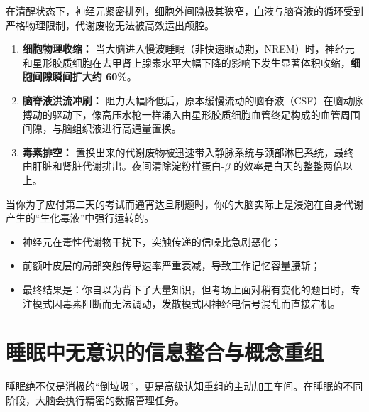 \documentclass[12pt,a4paper,openany]{ctexbook}
\begin{document}
在清醒状态下，神经元紧密排列，细胞外间隙极其狭窄，血液与脑脊液的循环受到严格物理限制，代谢废物无法被高效运出颅腔。

\begin{keypoint}[胶质淋巴系统的夜间清洗机制]
\begin{enumerate}
    \item \textbf{细胞物理收缩：} 当大脑进入慢波睡眠（非快速眼动期，NREM）时，神经元和星形胶质细胞在去甲肾上腺素水平大幅下降的影响下发生显著体积收缩，\textbf{细胞间隙瞬间扩大约 60\%}。
    \item \textbf{脑脊液洪流冲刷：} 阻力大幅降低后，原本缓慢流动的脑脊液（CSF）在脑动脉搏动的驱动下，像高压水枪一样涌入由星形胶质细胞血管终足构成的血管周围间隙，与脑组织液进行高通量置换。
    \item \textbf{毒素排空：} 置换出来的代谢废物被迅速带入静脉系统与颈部淋巴系统，最终由肝脏和肾脏代谢排出。夜间清除淀粉样蛋白-$\beta$ 的效率是白天的整整两倍以上。
\end{enumerate}
\end{keypoint}

\begin{warningbox}[熬夜突击的生化自残]
当你为了应付第二天的考试而通宵达旦刷题时，你的大脑实际上是浸泡在自身代谢产生的“生化毒液”中强行运转的。
\begin{itemize}
    \item 神经元在毒性代谢物干扰下，突触传递的信噪比急剧恶化；
    \item 前额叶皮层的局部突触传导速率严重衰减，导致工作记忆容量腰斩；
    \item 最终结果是：你自以为背下了大量知识，但考场上面对稍有变化的题目时，专注模式因毒素阻断而无法调动，发散模式因神经电信号混乱而直接宕机。
\end{itemize}
\end{warningbox}

\section{睡眠中无意识的信息整合与概念重组}

睡眠绝不仅是消极的“倒垃圾”，更是高级认知重组的主动加工车间。在睡眠的不同阶段，大脑会执行精密的数据管理任务。
\end{document}
